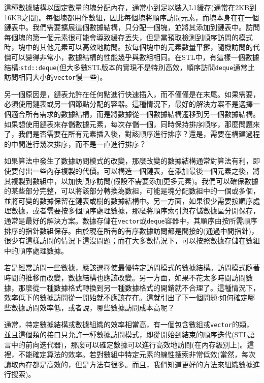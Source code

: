 這種數據結構以固定數量的塊分配內存，通常小到足以裝入L1緩存(通常在2KB到16KB之間)。每個塊都用作數組，因此每個塊將順序訪問元素，而塊本身在在一個鏈表中。我們需要擴展這個數據結構，只分配一個塊，並將其添加到鏈表中。訪問每個塊的第一個元素很可能會導致緩存丟失，但是當預取檢測到順序訪問的模式時，塊中的其他元素可以高效地訪問。按每個塊中的元素數量平攤，隨機訪問的代價可以變得非常小，數據結構的性能幾乎與數組相同。在STL中，有這樣一個數據結構:\texttt{std::deque}(但大多數STL版本的實現不是特別高效，順序訪問\texttt{deque}通常比訪問相同大小的\texttt{vector}慢一些)。

另一個原因是，鏈表允許在任何點進行快速插入，而不僅僅是在末尾。如果需要，必須使用鏈表或另一個節點分配的容器。這種情況下，最好的解決方案不是選擇一個適合所有需求的數據結構，而是將數據從一個數據結構遷移到另一個數據結構。如果想使用鏈表來存儲數據元素，每次存儲一個，同時保持排序順序，那麼問題來了，我們是否需要在所有元素插入後，對該順序進行排序？還是，需要在構建過程的中間進行幾次排序，而不是一直進行排序？

如果算法中發生了數據訪問模式的改變，那麼改變的數據結構通常對算法有利，即使要付出一些內存複製的代價。可以構造一個鏈表，在添加最後一個元素之後，將其複製到數組中，以加快順序訪問(假設不需要添加更多元素)。我們可以確保數據的某些部分完整，可以將該部分轉換為數組，可能是塊分配數組中的一個或多個，並將可變的數據保留在鏈表或樹的數據結構中。另一方面，如果很少需要按順序處理數據，或者需要按多個順序處理數據，那麼將順序索引與存儲數據區分開保存，通常是最好的解決方案。數據存儲在\texttt{vector}或\texttt{deque}容器中，其順序由按所需順序排序的指針數組保存。由於現在所有的有序數據訪問都是間接的(通過中間指針)，很少有這樣訪問的情況下這沒問題；而在大多數情況下，可以按照數據存儲在數組中的順序處理數據。

若是經常訪問一些數據，應該選擇使最優特定訪問模式的數據結構。訪問模式隨著時間的推移而改變，數據結構也應該改變。另一方面，如果不花太多時間訪問數據，那麼從一種數據格式轉換到另一種數據格式的開銷就不合理了。這種情況下，效率低下的數據訪問從一開始就不應該存在。這就引出了下一個問題:如何確定哪些數據訪問效率低，或者說，哪些數據訪問成本高呢？


通常，特定數據結構或數據組織的效率相當高，有一個包含數組或\texttt{vector}的類，並且這個類的接口只允許一種數據訪問模式，即從開始到結束的順序迭代(STL語言中的前向迭代器)，那麼可以確定數據可以進行高效地訪問(在內存級別上)。這裡，不能確定算法的效率。若對數組中特定元素的線性搜索非常低效(當然，每次讀取內存都是高效的，但是方法有很多。而且，我們知道更好的方法來組織數據進行搜索)。

